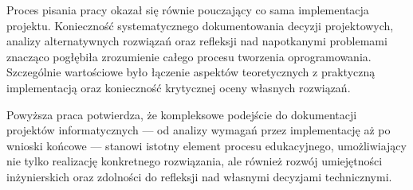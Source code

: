 \documentclass[a4paper,12pt,openany]{book}
\begin{document}
Proces pisania pracy okazał się równie pouczający co sama implementacja projektu. Konieczność systematycznego dokumentowania decyzji projektowych, analizy alternatywnych rozwiązań oraz refleksji nad napotkanymi problemami znacząco pogłębiła zrozumienie całego procesu tworzenia oprogramowania. Szczególnie wartościowe było łączenie aspektów teoretycznych z praktyczną implementacją oraz konieczność krytycznej oceny własnych rozwiązań.

Powyższa praca potwierdza, że kompleksowe podejście do dokumentacji projektów informatycznych --- od analizy wymagań przez implementację aż po wnioski końcowe --- stanowi istotny element procesu edukacyjnego, umożliwiający nie tylko realizację konkretnego rozwiązania, ale również rozwój umiejętności inżynierskich oraz zdolności do refleksji nad własnymi decyzjami technicznymi.

\listoffigures{} %
\end{document}
